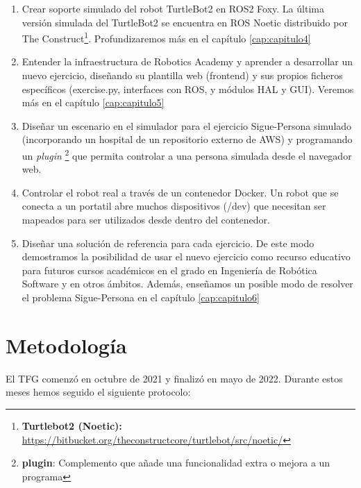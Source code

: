 \begin{enumerate}
	\item Crear soporte simulado del robot TurtleBot2 en ROS2 Foxy. La última versión simulada del TurtleBot2 se encuentra en ROS Noetic distribuido por The Construct\footnote{\textbf{Turtlebot2 (Noetic):} \url{https://bitbucket.org/theconstructcore/turtlebot/src/noetic/}}. Profundizaremos más en el capítulo \ref{cap:capitulo4}
	\item Entender la infraestructura de Robotics Academy y aprender a desarrollar un nuevo ejercicio, diseñando su plantilla web (frontend) y sus propios ficheros específicos (exercise.py, interfaces con ROS, y módulos HAL y GUI). Veremos más en el capítulo \ref{cap:capitulo5}
	\item Diseñar un escenario en el simulador para el ejercicio Sigue-Persona simulado (incorporando un hospital de un repositorio externo de AWS) y programando un \textit{plugin} \footnote{\textbf{plugin}: Complemento que añade una funcionalidad extra o mejora a un programa} que permita controlar a una persona simulada desde el navegador web.
	\item Controlar el robot real a través de un contenedor Docker. Un robot que se conecta a un portatil abre muchos dispositivos (/dev) que necesitan ser mapeados para ser utilizados desde dentro del contenedor.
	\item Diseñar una solución de referencia para cada ejercicio. De este modo demostramos la posibilidad de usar el nuevo ejercicio como recurso educativo para futuros cursos académicos en el grado en Ingeniería de Robótica Software y en otros ámbitos. Además, enseñamos un posible modo de resolver el problema Sigue-Persona en el capítulo \ref{cap:capitulo6}
\end{enumerate}



\section{Metodología}
\label{sec:metodologia}
El TFG comenzó en octubre de 2021 y finalizó en mayo de 2022. Durante estos meses hemos seguido el siguiente protocolo:

